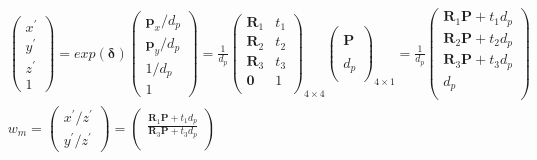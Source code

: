 \documentclass{article}
\begin{document}
\begin{CJK*}{GBK}{song}
\begin{equation}\left.
\begin{aligned}\\&
\begin{pmatrix}x^{'}\\y^{'}\\z^{'}\\1\end{pmatrix}=
exp(\boldsymbol{\delta})\begin{pmatrix}\boldsymbol{p}_x/d_p\\\boldsymbol{p}_y/d_p\\1/d_p\\1\end{pmatrix}
=\frac{1}{d_p}\left(
                \begin{array}{cc}
                  \boldsymbol{R}_1 & t_1 \\
                  \boldsymbol{R}_2 & t_2 \\
                  \boldsymbol{R}_3 & t_3 \\
                  \boldsymbol{0}   & 1 \\
                \end{array}
              \right)_{4\times{4}}
              \left(
                \begin{array}{c}
                    \\
                  \boldsymbol{P} \\
                   \\
                  {d_p} \\
                \end{array}
              \right)_{4\times{1}}
=\frac{1}{d_p}\left(
                \begin{array}{c}
                  \boldsymbol{R}_1\boldsymbol{P}+t_1d_p \\
                  \boldsymbol{R}_2\boldsymbol{P}+t_2d_p \\
                  \boldsymbol{R}_3\boldsymbol{P}+t_3d_p \\
                  d_p \\
                \end{array}
              \right)
\\&
w_m=\begin{pmatrix}{x^{'}}/{z^{'}}\\{y^{'}}/{z^{'}}\end{pmatrix}
=\begin{pmatrix}\frac{\boldsymbol{R}_1\boldsymbol{P}+t_1d_p}{\boldsymbol{R}_3\boldsymbol{P}+t_3d_p}\\

\end{pmatrix}
\end{aligned}
\end{equation}
\end{CJK*}
\end{document}
